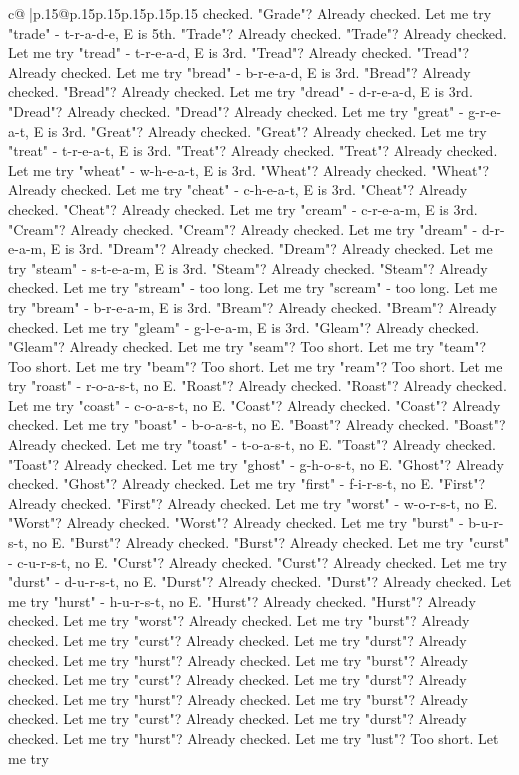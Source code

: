 \documentclass{article}
\begin{document}
{\begin{supertabular}{c@{$\;$}|p{.15\linewidth}@{}p{.15\linewidth}p{.15\linewidth}p{.15\linewidth}p{.15\linewidth}p{.15\linewidth}}
{{{checked. "Grade"? Already checked. Let me try "trade" {-} t{-}r{-}a{-}d{-}e, E is 5th. "Trade"? Already checked. "Trade"? Already checked. Let me try "tread" {-} t{-}r{-}e{-}a{-}d, E is 3rd. "Tread"? Already checked. "Tread"? Already checked. Let me try "bread" {-} b{-}r{-}e{-}a{-}d, E is 3rd. "Bread"? Already checked. "Bread"? Already checked. Let me try "dread" {-} d{-}r{-}e{-}a{-}d, E is 3rd. "Dread"? Already checked. "Dread"? Already checked. Let me try "great" {-} g{-}r{-}e{-}a{-}t, E is 3rd. "Great"? Already checked. "Great"? Already checked. Let me try "treat" {-} t{-}r{-}e{-}a{-}t, E is 3rd. "Treat"? Already checked. "Treat"? Already checked. Let me try "wheat" {-} w{-}h{-}e{-}a{-}t, E is 3rd. "Wheat"? Already checked. "Wheat"? Already checked. Let me try "cheat" {-} c{-}h{-}e{-}a{-}t, E is 3rd. "Cheat"? Already checked. "Cheat"? Already checked. Let me try "cream" {-} c{-}r{-}e{-}a{-}m, E is 3rd. "Cream"? Already checked. "Cream"? Already checked. Let me try "dream" {-} d{-}r{-}e{-}a{-}m, E is 3rd. "Dream"? Already checked. "Dream"? Already checked. Let me try "steam" {-} s{-}t{-}e{-}a{-}m, E is 3rd. "Steam"? Already checked. "Steam"? Already checked. Let me try "stream" {-} too long. Let me try "scream" {-} too long. Let me try "bream" {-} b{-}r{-}e{-}a{-}m, E is 3rd. "Bream"? Already checked. "Bream"? Already checked. Let me try "gleam" {-} g{-}l{-}e{-}a{-}m, E is 3rd. "Gleam"? Already checked. "Gleam"? Already checked. Let me try "seam"? Too short. Let me try "team"? Too short. Let me try "beam"? Too short. Let me try "ream"? Too short. Let me try "roast" {-} r{-}o{-}a{-}s{-}t, no E. "Roast"? Already checked. "Roast"? Already checked. Let me try "coast" {-} c{-}o{-}a{-}s{-}t, no E. "Coast"? Already checked. "Coast"? Already checked. Let me try "boast" {-} b{-}o{-}a{-}s{-}t, no E. "Boast"? Already checked. "Boast"? Already checked. Let me try "toast" {-} t{-}o{-}a{-}s{-}t, no E. "Toast"? Already checked. "Toast"? Already checked. Let me try "ghost" {-} g{-}h{-}o{-}s{-}t, no E. "Ghost"? Already checked. "Ghost"? Already checked. Let me try "first" {-} f{-}i{-}r{-}s{-}t, no E. "First"? Already checked. "First"? Already checked. Let me try "worst" {-} w{-}o{-}r{-}s{-}t, no E. "Worst"? Already checked. "Worst"? Already checked. Let me try "burst" {-} b{-}u{-}r{-}s{-}t, no E. "Burst"? Already checked. "Burst"? Already checked. Let me try "curst" {-} c{-}u{-}r{-}s{-}t, no E. "Curst"? Already checked. "Curst"? Already checked. Let me try "durst" {-} d{-}u{-}r{-}s{-}t, no E. "Durst"? Already checked. "Durst"? Already checked. Let me try "hurst" {-} h{-}u{-}r{-}s{-}t, no E. "Hurst"? Already checked. "Hurst"? Already checked. Let me try "worst"? Already checked. Let me try "burst"? Already checked. Let me try "curst"? Already checked. Let me try "durst"? Already checked. Let me try "hurst"? Already checked. Let me try "burst"? Already checked. Let me try "curst"? Already checked. Let me try "durst"? Already checked. Let me try "hurst"? Already checked. Let me try "burst"? Already checked. Let me try "curst"? Already checked. Let me try "durst"? Already checked. Let me try "hurst"? Already checked. Let me try "lust"? Too short. Let me try }}}
\end{supertabular}}
\end{document}
